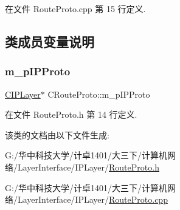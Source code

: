 在文件 Route\+Proto.\+cpp 第 15 行定义.



\subsection{类成员变量说明}
\mbox{\label{class_c_route_proto_a215ec5768c5e1c1d1350506b800f3d02}} 
\subsubsection{\texorpdfstring{m\+\_\+p\+I\+P\+Proto}{m\_pIPProto}}
{\footnotesize\ttfamily \hyperlink{class_c_i_p_layer}{C\+I\+P\+Layer}$\ast$ C\+Route\+Proto\+::m\+\_\+p\+I\+P\+Proto\hspace{0.3cm}{\ttfamily [protected]}}



在文件 Route\+Proto.\+h 第 14 行定义.



该类的文档由以下文件生成\+:\begin{DoxyCompactItemize}
\item 
G\+:/华中科技大学/计卓1401/大三下/计算机网络/\+Layer\+Interface/\+I\+P\+Layer/\hyperlink{_route_proto_8h}{Route\+Proto.\+h}\item 
G\+:/华中科技大学/计卓1401/大三下/计算机网络/\+Layer\+Interface/\+I\+P\+Layer/\hyperlink{_route_proto_8cpp}{Route\+Proto.\+cpp}\end{DoxyCompactItemize}
